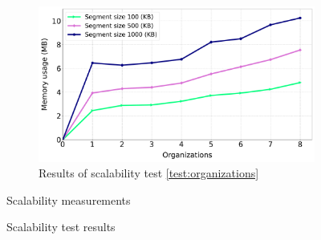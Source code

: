 \begin{figure}[t]
\begin{subfigure}{0.49\textwidth}   
  \centering
  \includegraphics[width=\textwidth]{content/figures/organizationstest-2.pdf}
  \caption{Results of scalability test \ref{test:organizations}}
  \label{fig:org_results}
\end{subfigure}
\begin{subtable}{0.49\textwidth}
  \centering
   \resizebox{0.97\textwidth}{!}{%
   	  
    }
  \label{table:TestCoefficentTable}
  \caption{Scalability measurements}
\end{subtable}
\caption{Scalability test results}
\label{fig:scalabtest}
\end{figure}

